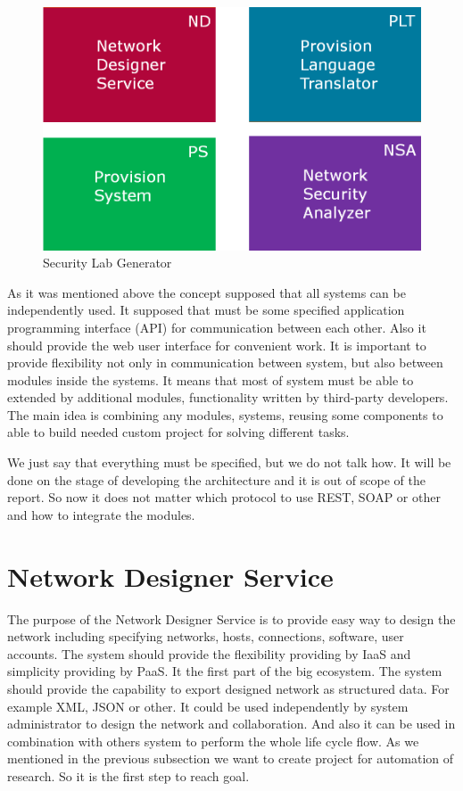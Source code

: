 \documentclass[twoside]{article}
\newcommand{\myNDS}{Network Designer Service}
\begin{document}
\begin{figure}[ht!]
\centering
\includegraphics[width=145mm]{slg_structure.png}
\caption{Security Lab Generator}
\label{overflow}
\end{figure}

As it was mentioned above the concept supposed that all systems can be independently used. It supposed that must be some specified application programming interface (API) for communication between each other. Also it should provide the web user interface for convenient work. It is important to provide flexibility not only in communication between system, but also between modules inside the systems. It means that most of system must be able to extended by additional modules, functionality written by third-party developers. The main idea is combining any modules, systems, reusing some components to able to build needed custom project for solving different tasks.    


We just say that everything must be specified, but we do not talk how. It will be done on the stage of developing the architecture and it is out of scope of the report. So now it does not matter which protocol to use REST, SOAP or other and how to integrate the modules.


\section{\myNDS}
The purpose of the \myNDS{ }is to provide easy way to design the network including specifying networks, hosts, connections, software, user accounts. The system should provide the flexibility providing by IaaS and simplicity providing by PaaS. It the first part of the big ecosystem. The system should provide the capability to export designed network as structured data. For example XML, JSON or other. It could be used independently by system administrator to design the network and collaboration. And also it can be used in combination with others system to perform the whole life cycle flow. As we mentioned in the previous subsection we want to create project for automation of research. So it is the first step to reach goal. 
\end{document}
